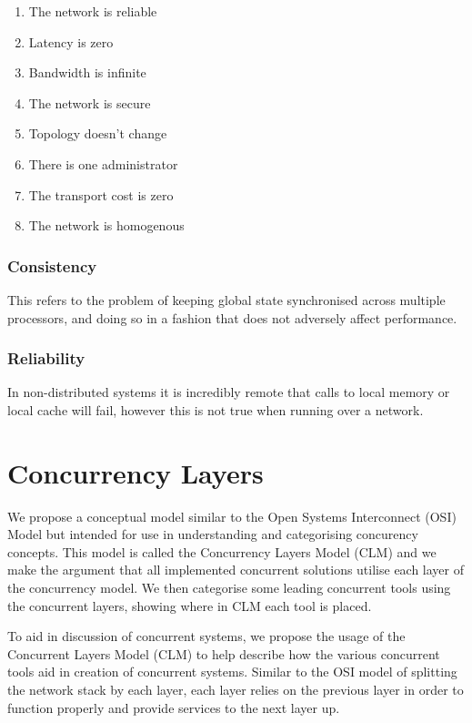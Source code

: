 \documentclass{sig-alternate}
\begin{document}
\begin{enumerate}
\item The network is reliable
\item Latency is zero
\item Bandwidth is infinite
\item The network is secure
\item Topology doesn't change
\item There is one administrator
\item The transport cost is zero
\item The network is homogenous
\end{enumerate}

\subsubsection{Consistency}
This refers to the problem of keeping global state synchronised across multiple processors, and doing so in a fashion that does not adversely affect performance.

\subsubsection{Reliability}
In non-distributed systems it is incredibly remote that calls to local memory or local cache will fail, however this is not true when running over a network. 

\section{Concurrency Layers}
We propose a conceptual model similar to the Open Systems Interconnect (OSI) Model but intended for use in understanding and categorising concurency concepts. This model is called the Concurrency Layers Model (CLM) and we make the argument that all implemented concurrent solutions utilise each layer of the concurrency model. We then categorise some leading concurrent tools using the concurrent layers, showing where in CLM each tool is placed.

To aid in discussion of concurrent systems, we propose the usage of the Concurrent Layers Model (CLM) to help describe how the various concurrent tools aid in creation of concurrent systems. Similar to the OSI model of splitting the network stack by each layer, each layer relies on the previous layer in order to function properly and provide services to the next layer up.
\end{document}
